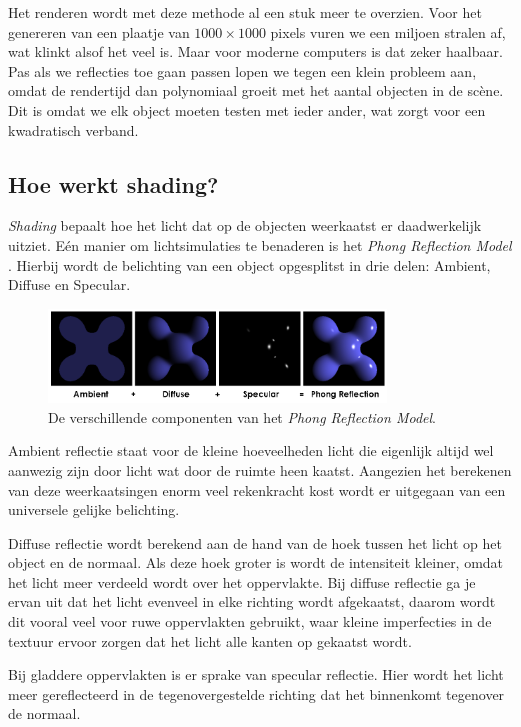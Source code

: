 \documentclass[12pt, a4paper]{article}
\begin{document}
Het renderen wordt met deze methode al een stuk meer te overzien. Voor het genereren van een plaatje van \(1000\times 1000\) pixels vuren we een miljoen stralen af, wat klinkt alsof het veel is. Maar voor moderne computers is dat zeker haalbaar. Pas als we reflecties toe gaan passen lopen we tegen een klein probleem aan, omdat de rendertijd dan polynomiaal groeit met het aantal objecten in de scène. Dit is omdat we elk object moeten testen met ieder ander, wat zorgt voor een kwadratisch verband.

\subsection{Hoe werkt shading?}
\textit{Shading} bepaalt hoe het licht dat op de objecten weerkaatst er daadwerkelijk uitziet. 
Eén manier om lichtsimulaties te benaderen is het \emph{Phong Reflection Model} \cite{PhongReflectionModel}. Hierbij wordt de belichting van een object opgesplitst in drie delen: Ambient, Diffuse en Specular.
\begin{figure}[H]
\centering
\includegraphics[width=0.8\textwidth]{Phong_components.png}
\caption{De verschillende componenten van het \emph{Phong Reflection Model}.}
\label{fig:phong_components}
\end{figure}

Ambient reflectie staat voor de kleine hoeveelheden licht die eigenlijk altijd wel aanwezig zijn door licht wat door de ruimte heen kaatst. Aangezien het berekenen van deze weerkaatsingen enorm veel rekenkracht kost wordt er uitgegaan van een universele gelijke belichting. 

Diffuse reflectie wordt berekend aan de hand van de hoek tussen het licht op het object en de normaal. Als deze hoek groter is wordt de intensiteit kleiner, omdat het licht meer verdeeld wordt over het oppervlakte. Bij diffuse reflectie ga je ervan uit dat het licht evenveel in elke richting wordt afgekaatst, daarom wordt dit vooral veel voor ruwe oppervlakten gebruikt, waar kleine imperfecties in de textuur ervoor zorgen dat het licht alle kanten op gekaatst wordt.

Bij gladdere oppervlakten is er sprake van specular reflectie. Hier wordt het licht meer gereflecteerd in de tegenovergestelde richting dat het binnenkomt tegenover de normaal. 
\end{document}
